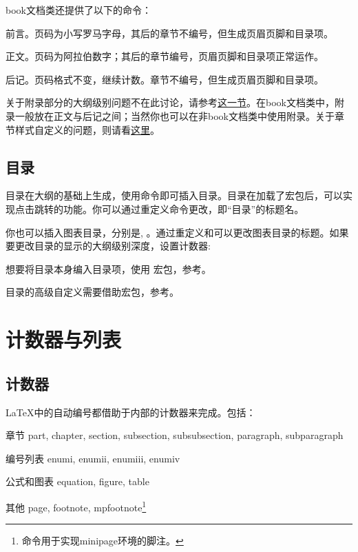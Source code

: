 book文档类还提供了以下的命令：
\begin{para}
\item[\latexline{frontmatter}] 前言。页码为小写罗马字母，其后的章节不编号，但生成页眉页脚和目录项。
\item[\latexline{mainmatter}] 正文。页码为阿拉伯数字；其后的章节编号，页眉页脚和目录项正常运作。
\item[\latexline{backmatter}] 后记。页码格式不变，继续计数。章节不编号，但生成页眉页脚和目录项。
\end{para}

关于附录部分的大纲级别问题不在此讨论，请参考\hyperref[sec:appendix]{这一节}。在book文档类中，附录一般放在正文与后记之间；当然你也可以在非book文档类中使用附录。关于章节样式自定义的问题，则请看\hyperref[sec:titlesec]{这里}。

\subsection{目录}
目录在大纲的基础上生成，使用命令即可插入目录。目录在加载了宏包后，可以实现点击跳转的功能。你可以通过重定义命令更改，即“目录”的标题名。
\begin{latex}
\renewcommand{\contensname}{目录}
\end{latex}

你也可以插入图表目录，分别是, 。通过重定义和可以更改图表目录的标题。如果要更改目录的显示的大纲级别深度，设置计数器:
\begin{latex}
\setcounter{tocdepth}{2} %
\end{latex}

想要将目录本身编入目录项，使用  宏包，参考\pageref{pkg:tocbibind}。

目录的高级自定义需要借助宏包，参考。

\section{计数器与列表}

\subsection{计数器}
\LaTeX 中的自动编号都借助于内部的计数器来完成。包括：
\begin{fead}
\item[章节] part, chapter, section, subsection, subsubsection, paragraph, subparagraph
\item[编号列表] enumi, enumii, enumiii, enumiv
\item[公式和图表] equation, figure, table
\item[其他] page, footnote, mpfootnote\footnote{命令用于实现minipage环境的脚注。}
\end{fead}

